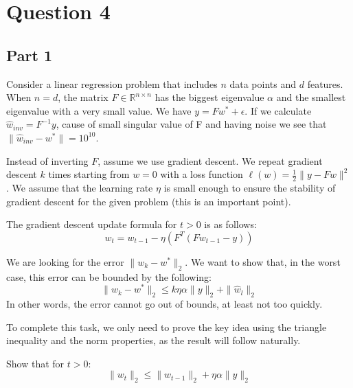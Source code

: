 \section{Question 4}
\subsection{Part 1}
Consider a linear regression problem that includes \( n \) data points and \( d \) features. When \( n = d \), the matrix \( F \in \mathbb{R}^{n \times n} \) has the biggest eigenvalue \( \alpha \) and the smallest eigenvalue with a very small value. We have \( y = Fw^* + \epsilon \). If we calculate \( \hat{w}_{inv} = F^{-1} y \), cause of small singular value of F and having noise we see that \( \|\hat{w}_{inv} - w^*\| = 10^{10} \).

Instead of inverting \( F \), assume we use gradient descent. We repeat gradient descent \( k \) times starting from \( w = 0 \) with a loss function \( \ell(w) = \frac{1}{2} \| y - Fw \|^2 \). We assume that the learning rate \( \eta \) is small enough to ensure the stability of gradient descent for the given problem (this is an important point).

The gradient descent update formula for \( t > 0 \) is as follows:
\[
w_t = w_{t-1} - \eta \left( F^T \left( F w_{t-1} - y \right) \right)
\]

We are looking for the error \( \| w_k - w^* \|_2 \). We want to show that, in the worst case, this error can be bounded by the following:
\[
\| w_k - w^* \|_2 \leq k \eta \alpha \| y\|_2 + \| \hat{w}_l \|_2
\]
In other words, the error cannot go out of bounds, at least not too quickly.

To complete this task, we only need to prove the key idea using the triangle inequality and the norm properties, as the result will follow naturally.

Show that for \( t > 0 \):
\[
\| w_t \|_2 \leq \| w_{t-1} \|_2 + \eta \alpha \| y \|_2
\]

